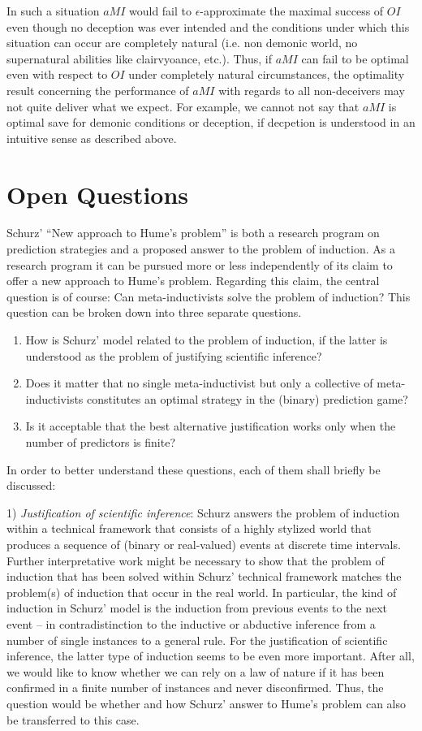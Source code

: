 \documentclass[12pt, a4paper]{article}
\numberwithin{equation}{section}
\begin{document}
In such a situation $aMI$ would fail to $\epsilon$-approximate the
maximal success of $OI$ even though no deception was ever intended and
the conditions under which this situation can occur are completely
natural (i.e. non demonic world, no supernatural abilities like
clairvyoance, etc.). Thus, if $aMI$ can fail to be optimal even with
respect to $OI$ under completely natural circumstances, the optimality
result concerning the performance of $aMI$ with regards to all
non-deceivers may not quite deliver what we expect. For example, we
cannot not say that $aMI$ is optimal save for demonic conditions or
deception, if decpetion is understood in an intuitive sense as
described above.

\section{Open Questions}

Schurz' ``New approach to Hume's problem'' is both a research program on
prediction strategies and a proposed answer to the problem of induction.
As a research program it can be pursued more or less independently of its
claim to offer a new approach to Hume's problem. Regarding this
claim, the central question is of course: Can meta-in\-ductivists solve
the problem of induction? This question can be broken down into three
separate questions.

\begin{enumerate}
  \item How is Schurz' model related to the problem of induction,
  if the latter is understood as the problem of justifying scientific
  inference? 
  \item Does it matter that no
  single meta-inductivist but only a collective of meta-inductivists
  constitutes an optimal strategy in the (binary) prediction game? 
  \item Is it acceptable that the best alternative justification
  works only when the number of predictors is finite?
\end{enumerate}

In order to better understand these questions, each of them shall
briefly be discussed:

1) {\em Justification of scientific inference}: Schurz answers the
problem of induction within a technical framework that consists of a
highly stylized world that produces a sequence of (binary or real-valued)
events at discrete time intervals. Further interpretative work might be
necessary to show that the problem of induction that has been solved
within Schurz' technical framework matches the problem(s) of induction
that occur in the real world. In particular, the kind of induction in
Schurz' model is the induction from previous events to the next event -- in
contradistinction to the inductive or abductive inference from a number
of single instances to a general rule. For the justification of
scientific inference, the latter type of induction seems to be even more
important. After all, we would like to know whether we can rely on a law
of nature if it has been confirmed in a finite number of instances and
never disconfirmed. Thus, the question would be whether and how Schurz'
answer to Hume's problem can also be transferred to this case.
\end{document}
